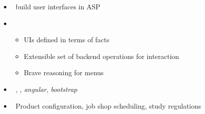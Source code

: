 \begin{frame}{\clinguin}
  \begin{itemize}
    \item {} \ build user interfaces in ASP
    \item {}
      \begin{itemize}
      \item UIs defined in terms of facts
      \item Extensible set of backend operations for interaction
      \item Brave reasoning for menus
      \end{itemize}
    \item {} \ \clingo, \clorm, \textit{angular}, \textit{bootstrap}
    \item {} \ Product configuration, job shop scheduling, study regulations~\cite{hamaneotroscsc23a}
  \end{itemize}
\end{frame}
%
